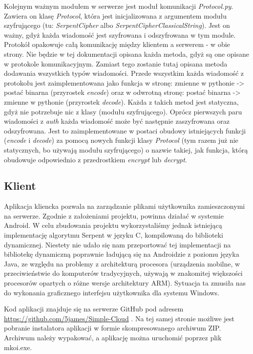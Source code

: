 \documentclass{article}
\begin{document}
	Kolejnym ważnym modułem w serwerze jest moduł komunikacji \textit{Protocol.py}. Zawiera on klasę \textit{Protocol}, która jest inicjalizowana z argumentem modułu szyfrującego (tu: \textit{SerpentCipher} albo \textit{SerpentCipherClassicalString}). Jest on ważny, gdyż każda wiadomość jest szyfrowana i odszyfrowana w tym module. Protokół opakowuje całą komunikację między klientem a serwerem - w obie strony. Nie będzie w tej dokumentacji opisana każda metoda, gdyż są one opisane w protokole komunikacyjnym. Zamiast tego zostanie tutaj opisana metoda dodawania wszystkich typów wiadomości. Przede wszystkim każda wiadomość z protokołu jest zaimplementowana jako funkcja w stronę: zmienne w pythonie -> postać binarna (przyrostek \textit{encode}) oraz w odwrotną stronę: postać binarna -> zmienne w pythonie (przyrostek \textit{decode}). Każda z takich metod jest statyczna, gdyż nie potrzebuje nic z klasy (modułu szyfrującego). Oprócz pierwszych paru wiadomości z \textit{auth} każda wiadomość może być następnie zaszyfrowana oraz odszyfrowana. Jest to zaimplementowane w postaci obudowy istniejących funkcji (\textit{encode} i \textit{decode}) za pomocą nowych funkcji klasy \textit{Protocol} (tym razem już nie statycznych, bo używają modułu szyfrującego) o nazwie takiej, jak funkcja, którą obudowuje odpowiednio z przedrostkiem \textit{encrypt} lub \textit{decrypt}.
	
	\subsection{Klient}
	Aplikacja kliencka pozwala na zarządzanie plikami użytkownika zamieszczonymi na serwerze. Zgodnie z założeniami projektu, powinna działać w systemie Android. W celu zbudowania projektu wykorzystaliśmy jednak istniejącą implementację algorytmu Serpent w języku C, kompilowaną do biblioteki dynamicznej. Niestety nie udało się nam przeportować tej implementacji na bibliotekę dynamiczną poprawnie ładującą się na Androidzie z poziomu języka Java, ze względu na problemy z architekturą procesora (urządzenia mobilne, w przeciwieństwie do komputerów tradycyjnych, używają w znakomitej większości procesorów opartych o różne wersje architektury ARM). Sytuacja ta zmusiła nas do wykonania graficznego interfejsu użytkownika dla systemu Windows. 
	
	Kod aplikacji znajduje się na serwerze GitHub pod adresem \url{https://github.com/5james/Simple-Cloud} . Na tej samej stronie możliwe jest pobranie instalatora aplikacji w formie skompresowanego archiwum ZIP. Archiwum należy wypakować, a aplikację można uruchomić poprzez plik mkoi.exe. 
	
\end{document}
